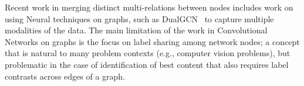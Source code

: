 Recent work in merging distinct multi-relations between nodes includes work on using Neural techniques on graphs, such as DualGCN~\cite{DualGCN} to capture multiple modalities of the data. The main limitation of the work in Convolutional Networks on graphs is the focus on label sharing among network nodes; a concept that is natural to many problem contexts (e.g., computer vision problems), but problematic in the case of identification of best content that also requires label contrasts across edges of a graph.






